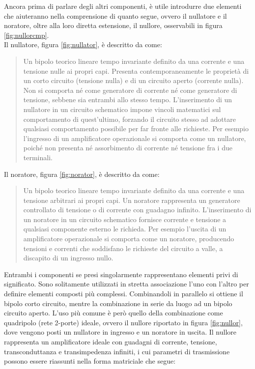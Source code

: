 Ancora prima di parlare degli altri componenti, è utile introdurre due elementi che aiuteranno nella comprensione di quanto segue, ovvero il nullatore e il noratore, oltre alla loro diretta estensione, il nullore, osservabili in figura \ref{fig:nullorcmp}.\\
Il nullatore, figura \ref{fig:nullator}, è descritto da \cite{Wikipedia} come:
\begin{quote}
 Un bipolo teorico lineare tempo invariante definito da una corrente e una tensione nulle ai propri capi. Presenta contemporaneamente le proprietà di un corto circuito (tensione nulla) e di un circuito aperto (corrente nulla). Non si comporta né come generatore di corrente né come generatore di tensione, sebbene sia entrambi allo stesso tempo. L'inserimento di un nullatore in un circuito schematico impone vincoli matematici sul comportamento di quest'ultimo, forzando il circuito stesso ad adottare qualsiasi comportamento possibile per far fronte alle richieste. Per esempio l'ingresso di un amplificatore operazionale si comporta come un nullatore, poiché non presenta né assorbimento di corrente né tensione fra i due terminali.
\end{quote}
Il noratore, figura \ref{fig:norator}, è descritto da \cite{Wikipedia} come:
\begin{quote}
 Un bipolo teorico lineare tempo invariante definito da una corrente e una tensione arbitrari ai propri capi. Un noratore rappresenta un generatore controllato di tensione o di corrente con guadagno infinito. L'inserimento di un noratore in un circuito schematico fornisce corrente e tensione a qualsiasi componente esterno le richieda. Per esempio l'uscita di un amplificatore operazionale si comporta come un noratore, producendo tensioni e correnti che soddisfano le richieste del circuito a valle, a discapito di un ingresso nullo.
\end{quote}
Entrambi i componenti se presi singolarmente rappresentano elementi privi di significato. Sono solitamente utilizzati in stretta associazione l'uno con l'altro per definire elementi composti più complessi. Combinandoli in parallelo si ottiene il bipolo corto circuito, mentre la combinazione in serie da luogo ad un bipolo circuito aperto. L'uso più comune è però quello della combinazione come quadripolo (rete 2-porte) ideale, ovvero il nullore riportato in figura \ref{fig:nullor}, dove vengono posti un nullatore in ingresso e un noratore in uscita. Il nullore rappresenta un amplificatore ideale con guadagni di corrente, tensione, transconduttanza e transimpedenza infiniti, i cui parametri di trasmissione possono essere riassunti nella forma matriciale che segue:
